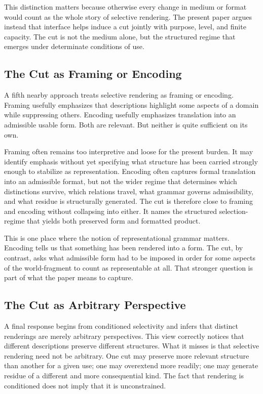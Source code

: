 \documentclass[11pt]{article}
\begin{document}
This distinction matters because otherwise every change in medium or format would count as the whole story of selective rendering. The present paper argues instead that interface helps induce a cut jointly with purpose, level, and finite capacity. The cut is not the medium alone, but the structured regime that emerges under determinate conditions of use.

\subsection{The Cut as Framing or Encoding}

A fifth nearby approach treats selective rendering as framing or encoding. Framing usefully emphasizes that descriptions highlight some aspects of a domain while suppressing others. Encoding usefully emphasizes translation into an admissible usable form. Both are relevant. But neither is quite sufficient on its own.

Framing often remains too interpretive and loose for the present burden. It may identify emphasis without yet specifying what structure has been carried strongly enough to stabilize as representation. Encoding often captures formal translation into an admissible format, but not the wider regime that determines which distinctions survive, which relations travel, what grammar governs admissibility, and what residue is structurally generated. The cut is therefore close to framing and encoding without collapsing into either. It names the structured selection-regime that yields both preserved form and formatted product.

This is one place where the notion of representational grammar matters. Encoding tells us that something has been rendered into a form. The cut, by contrast, asks what admissible form had to be imposed in order for some aspects of the world-fragment to count as representable at all. That stronger question is part of what the paper means to capture.

\subsection{The Cut as Arbitrary Perspective}

A final response begins from conditioned selectivity and infers that distinct renderings are merely arbitrary perspectives. This view correctly notices that different descriptions preserve different structures. What it misses is that selective rendering need not be arbitrary. One cut may preserve more relevant structure than another for a given use; one may overextend more readily; one may generate residue of a different and more consequential kind. The fact that rendering is conditioned does not imply that it is unconstrained. \cite{chakravartty_scientific_realism_sep,ladyman_structural_realism_sep,scientific_pluralism_sep}
\end{document}
